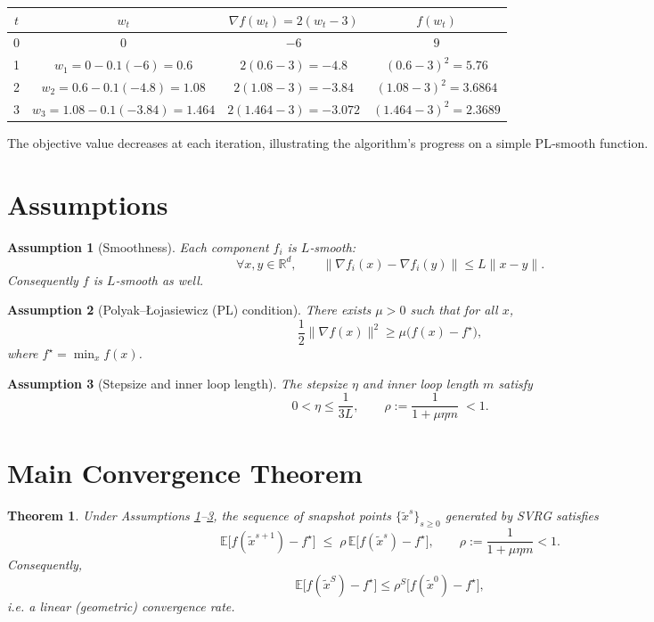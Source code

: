 \documentclass{article}
\newtheorem{theorem}{Theorem}
\newtheorem{assumption}{Assumption}
\begin{document}
\begin{center}
\begin{tabular}{c|c|c|c}
$t$ & $w_t$ & $\nabla f(w_t)=2(w_t-3)$ & $f(w_t)$\\ \hline
0 & $0$ & $-6$ & $9$\\
1 & $w_{1}=0-0.1(-6)=0.6$ & $2(0.6-3)=-4.8$ & $(0.6-3)^2=5.76$\\
2 & $w_{2}=0.6-0.1(-4.8)=1.08$ & $2(1.08-3)=-3.84$ & $(1.08-3)^2=3.6864$\\
3 & $w_{3}=1.08-0.1(-3.84)=1.464$ & $2(1.464-3)=-3.072$ & $(1.464-3)^2=2.3689$
\end{tabular}
\end{center}
The objective value decreases at each iteration, illustrating the algorithm’s progress on a simple PL‑smooth function.

\newpage
\section*{Assumptions}
\begin{assumption}[Smoothness]\label{ass:smooth}
Each component $f_i$ is $L$‑smooth:
\[
\forall x,y\in\mathbb{R}^{d},\qquad
\|\nabla f_i(x)-\nabla f_i(y)\|\le L\|x-y\|.
\]
Consequently $f$ is $L$‑smooth as well.
\end{assumption}
\begin{assumption}[Polyak–\L{}ojasiewicz (PL) condition]\label{ass:pl}
There exists $\mu>0$ such that for all $x$,
\[
\frac{1}{2}\|\nabla f(x)\|^{2}\ge \mu\bigl(f(x)-f^{\star}\bigr),
\]
where $f^{\star}= \min_{x}f(x)$.
\end{assumption}
\begin{assumption}[Stepsize and inner loop length]\label{ass:params}
The stepsize $\eta$ and inner loop length $m$ satisfy
\[
0<\eta\le\frac{1}{3L},\qquad
\rho:=\frac{1}{1+\mu\eta m}\;<1.
\]
\end{assumption}

\section*{Main Convergence Theorem}
\begin{theorem}\label{thm:linear}
Under Assumptions \ref{ass:smooth}–\ref{ass:params}, the sequence of snapshot points $\{\tilde{x}^{s}\}_{s\ge0}$ generated by SVRG satisfies
\[
\boxed{
\mathbb{E}\bigl[f(\tilde{x}^{s+1})-f^{\star}\bigr]\;\le\;\rho\,
\mathbb{E}\bigl[f(\tilde{x}^{s})-f^{\star}\bigr]},\qquad
\rho:=\frac{1}{1+\mu\eta m}<1.
\]
Consequently,
\[
\mathbb{E}\bigl[f(\tilde{x}^{S})-f^{\star}\bigr]\le\rho^{S}\bigl[f(\tilde{x}^{0})-f^{\star}\bigr],
\]
i.e. a linear (geometric) convergence rate.
\end{theorem}
\end{document}
